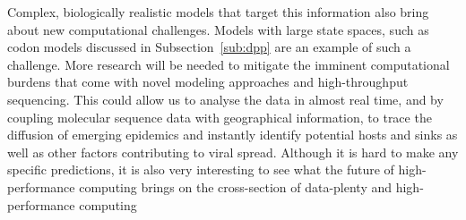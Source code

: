 Complex, biologically realistic models that target this information also bring about new computational challenges.
Models with large state spaces, such as codon models discussed in Subsection~\ref{sub:dpp} are an example of such a challenge.
More research will be needed to mitigate the imminent computational burdens that come with novel modeling approaches and high-throughput sequencing. 
This could allow us to analyse the data in almost real time, and by coupling molecular sequence data with geographical information, to trace the diffusion of emerging epidemics and instantly identify potential hosts and sinks as well as  other factors contributing to viral spread.  
Although it is hard to make any specific predictions, it is also very interesting to see what the future of high-performance computing brings on the cross-section of data-plenty and high-performance computing
















